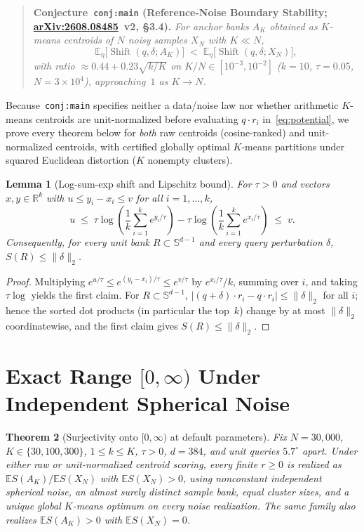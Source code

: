 \documentclass[11pt]{article}
\theoremstyle{plain}
\newtheorem{theorem}{Theorem}
\newtheorem{lemma}[theorem]{Lemma}
\theoremstyle{definition}
\theoremstyle{remark}
\DeclareMathOperator{\Shift}{Shift}
\begin{document}
\begin{quote}
\textbf{Conjecture~\texttt{conj:main} (Reference-Noise Boundary Stability; \href{https://arxiv.org/abs/2608.08485}{arXiv:2608.08485}~v2, \S 3.4).}
\emph{For anchor banks $A_K$ obtained as $K$-means centroids of $N$ noisy samples $X_N$ with $K \ll N$,
\[
\mathbb{E}_\eta\bigl[\Shift(q, \delta; A_K)\bigr]
\;<\;
\mathbb{E}_\eta\bigl[\Shift(q, \delta; X_N)\bigr],
\]
with ratio $\approx 0.44 + 0.23\sqrt{k/K}$ on $K/N \in [10^{-3}, 10^{-2}]$ ($k = 10$, $\tau = 0.05$, $N = 3 \times 10^4$), approaching~$1$ as $K \to N$.}
\end{quote}

Because~\texttt{conj:main} specifies neither a data/noise law nor whether arithmetic $K$-means centroids are unit-normalized before evaluating $q \cdot r_i$ in~\eqref{eq:potential}, we prove every theorem below for \emph{both} raw centroids (cosine-ranked) and unit-normalized centroids, with certified globally optimal $K$-means partitions under squared Euclidean distortion ($K$ nonempty clusters).

\begin{lemma}[Log-sum-exp shift and Lipschitz bound]\label{lem:lse}
For $\tau > 0$ and vectors $x, y \in \mathbb{R}^k$ with $u \le y_i - x_i \le v$ for all $i = 1, \dots, k$,
\[
u \;\le\; \tau\log\!\left(\frac{1}{k}\sum_{i=1}^k e^{y_i/\tau}\right) - \tau\log\!\left(\frac{1}{k}\sum_{i=1}^k e^{x_i/\tau}\right) \;\le\; v.
\]
Consequently, for every unit bank $R \subset \mathbb{S}^{d-1}$ and every query perturbation $\delta$, $S(R) \le \|\delta\|_2$.
\end{lemma}

\begin{proof}
Multiplying $e^{u/\tau} \le e^{(y_i - x_i)/\tau} \le e^{v/\tau}$ by $e^{x_i/\tau}/k$, summing over $i$, and taking $\tau\log$ yields the first claim. For $R \subset \mathbb{S}^{d-1}$, $|(q + \delta)\cdot r_i - q \cdot r_i| \le \|\delta\|_2$ for all $i$; hence the sorted dot products (in particular the top~$k$) change by at most $\|\delta\|_2$ coordinatewise, and the first claim gives $S(R) \le \|\delta\|_2$.
\end{proof}

\section{Exact Range \texorpdfstring{$[0, \infty)$}{[0, infinity)} Under Independent Spherical Noise}

\begin{theorem}[Surjectivity onto $[0, \infty)$ at default parameters]\label{thm:paired}
Fix $N = 30{,}000$, $K \in \{30, 100, 300\}$, $1 \le k \le K$, $\tau > 0$, $d = 384$, and unit queries $5.7^\circ$ apart. Under either raw or unit-normalized centroid scoring, every finite $r \ge 0$ is realized as $\mathbb{E}S(A_K)/\mathbb{E}S(X_N)$ with $\mathbb{E}S(X_N) > 0$, using nonconstant independent spherical noise, an almost surely distinct sample bank, equal cluster sizes, and a unique global $K$-means optimum on every noise realization. The same family also realizes $\mathbb{E}S(A_K) > 0$ with $\mathbb{E}S(X_N) = 0$.
\end{theorem}
\end{document}
